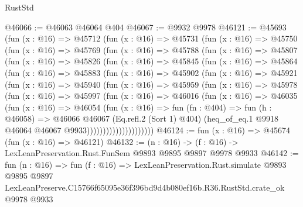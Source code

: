 \begin{lexlean}{RustStd}
\begin{coremodule}
@46066 := @46063 @46064 @404
@46067 := @9932 @9978
@46121 := @45693
    (fun (x : @16) =>
    @45712
      (fun (x : @16) =>
      @45731
        (fun (x : @16) =>
        @45750
          (fun (x : @16) =>
          @45769
            (fun (x : @16) =>
            @45788
              (fun (x : @16) =>
              @45807
                (fun (x : @16) =>
                @45826
                  (fun (x : @16) =>
                  @45845
                    (fun (x : @16) =>
                    @45864
                      (fun (x : @16) =>
                      @45883
                        (fun (x : @16) =>
                        @45902
                          (fun (x : @16) =>
                          @45921
                            (fun (x : @16) =>
                            @45940
                              (fun (x : @16) =>
                              @45959
                                (fun (x : @16) =>
                                @45978
                                  (fun (x : @16) =>
                                  @45997
                                    (fun (x : @16) =>
                                    @46016
                                      (fun (x : @16) =>
                                      @46035
                                        (fun (x : @16) =>
                                        @46054
                                          (fun (x : @16) =>
                                          fun (fn : @404) =>
                                          fun (h : @46058) =>
                                          @46066
                                            @46067
                                            (Eq.refl.{2} (Sort 1) @404)
                                            (heq_of_eq.{1}
                                              @9918
                                              @46064
                                              @46067
                                              @9933)))))))))))))))))))))
@46124 := fun (x : @16) => @45674 (fun (x : @16) => @46121)
@46132 := (n : @16) -> (f : @16) -> LexLeanPreservation.Rust.FunSem @9893 @9895 @9897 @9978 @9933
@46142 := fun (n : @16) =>
  fun (f : @16) =>
  LexLeanPreservation.Rust.simulate
    @9893
    @9895
    @9897
    LexLeanPreserve.C15766f65095e36f396bd9d4b080ef16b.R36.RustStd.crate_ok
    @9978
    @9933
\end{coremodule}
\end{lexlean}
